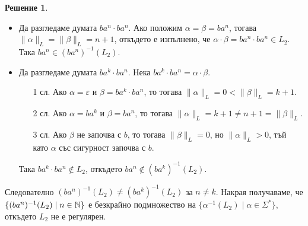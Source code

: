 \documentclass{article}
\theoremstyle{definition}
\newtheorem*{solution}{Решение}
\begin{document}
\begin{solution}
\begin{itemize}
\begin{itemize}
                  \item Да разгледаме думата $b a^n \cdot b a^n$.
                        Ако положим $\alpha = \beta = b a^n$, тогава $\|\alpha\|_L = \|\beta\|_L = n + 1$, откъдето е изпълнено, че $\alpha \cdot \beta = b a^n \cdot b a^n \in L_2$.
                        Така $b a^n \in (b a^n)^{-1}(L_2)$.
                  \item Да разгледаме думата $b a^k \cdot b a^n$.
                        Нека $b a^k \cdot b a^n = \alpha \cdot \beta$.
                        \begin{itemize}
                            \item[1 сл.] Ако $\alpha = \varepsilon$ и $\beta = b a^k \cdot b a^n$, то тогава $\|\alpha\|_L = 0 < \|\beta\|_L = k + 1$.
                            \item[2 сл.] Ако $\alpha = b a^k$ и $\beta = b a^n$, то тогава $\|\alpha\|_L = k + 1 \neq n + 1 = \|\beta\|_L$.
                            \item[3 сл.] Ако $\beta$ не започва с $b$, то тогава $\|\beta\|_L = 0$, но $\|\alpha\|_L > 0$, тъй като $\alpha$ със сигурност започва с $b$.
                        \end{itemize}
                        Така $b a^k \cdot b a^n \notin L_2$, откъдето $b a^n \notin (b a^k)^{-1}(L_2)$.
              \end{itemize}
              Следователно $(b a^n)^{-1}(L_2) \neq (b a^k)^{-1}(L_2)$ за $n \neq k$.
              Накрая получаваме, че $\{ (b a^n)^{-1}(L_2) \mid n \in \mathbb{N} \}$ е безкрайно подмножество на $\{ \alpha^{-1}(L_2) \mid \alpha \in \Sigma^* \}$, откъдето $L_2$ не е регулярен.


\end{itemize}
\end{solution}
\end{document}
